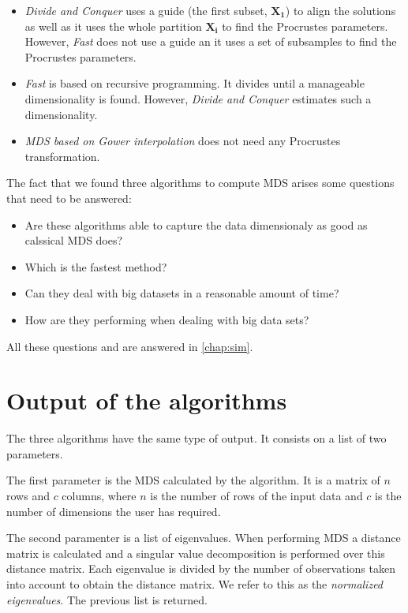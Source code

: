 \documentclass[11pt]{report}
\begin{document}
\begin{itemize}
\item \textit{Divide and Conquer} uses a guide (the first subset, $\mathbf{X_1}$)
to align the solutions as well as it uses the whole partition $\mathbf{X_i}$ to
find the Procrustes parameters. However, \textit{Fast} does not use a guide an 
it uses a set of subsamples to find the Procrustes parameters.

\item \textit{Fast} is based on recursive programming. It divides until 
a manageable dimensionality is found. However, \textit{Divide and Conquer} 
estimates such a dimensionality.

\item \textit{MDS based on Gower interpolation} does not need any Procrustes
transformation. 

\end{itemize}

The fact that we found three algorithms to compute MDS arises some questions 
that need to be answered:

\begin{itemize}
\item Are these algorithms able to capture the data dimensionaly as good as 
calssical MDS does?
\item Which is the fastest method?
\item Can they deal with big datasets in a reasonable amount of time?
\item How are they performing when dealing with big data sets?
\end{itemize}

All these questions and are answered in \autoref{chap:sim}.

\section{Output of the algorithms}
The three algorithms have the same type of output. It consists on a list of 
two parameters. 

\indent The first parameter is the MDS calculated by the algorithm. It is a 
matrix of $n$ rows and $c$ columns, where $n$ is the number of rows of the 
input data and $c$ is the number of dimensions the user has required.

\indent The second paramenter is a list of eigenvalues. When performing MDS
a distance matrix is calculated and a singular value decomposition is performed
over this distance matrix. Each eigenvalue is divided by the number of 
observations taken into account to obtain the distance matrix. We refer to 
this as the \textit{normalized eigenvalues}. The previous list is 
returned.
\end{document}
